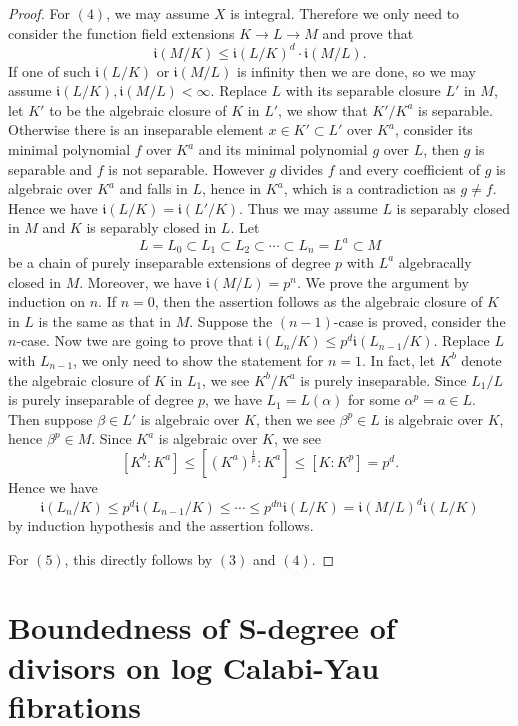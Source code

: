 \documentclass[letterpaper,reqno,12pt]{amsart}
\numberwithin{equation}{section}
\theoremstyle{plain}
\begin{document}
\begin{proof}
    For $(4)$, we may assume $X$ is integral. Therefore we only need to consider the function field extensions $K\to L\to M$ and prove that \[\mathfrak i(M/K)\leq \mathfrak i(L/K)^d\cdot\mathfrak i(M/L).\] If one of such $\mathfrak i(L/K)$ or $\mathfrak i(M/L)$ is infinity then we are done, so we may assume $\mathfrak i(L/K),\mathfrak i(M/L)<\infty$. Replace $L$ with its separable closure $L'$ in $M$, let $K'$ to be the algebraic closure of $K$ in $L'$, we show that $K'/K^a$ is separable. Otherwise there is an inseparable element $x\in K'\subset L'$ over $K^a$, consider its minimal polynomial $f$ over $K^a$ and its minimal polynomial $g$ over $L$, then $g$ is separable and $f$ is not separable. However $g$ divides $f$ and every coefficient of $g$ is algebraic over $K^a$ and falls in $L$, hence in $K^a$, which is a contradiction as $g\neq f$. Hence we have $\mathfrak i(L/K)=\mathfrak i(L'/K)$. Thus we may assume $L$ is separably closed in $M$ and $K$ is separably closed in $L$. Let \[L=L_0\subset L_1\subset L_2\subset\cdots\subset L_n=L^a\subset M\] be a chain of purely inseparable extensions of degree $p$ with $L^a$ algebracally closed in $M$. Moreover, we have $\mathfrak i(M/L)=p^n$. We prove the argument by induction on $n$. If $n=0$, then the assertion follows as the algebraic closure of $K$ in $L$ is the same as that in $M$. Suppose the $(n-1)$-case is proved, consider the $n$-case. Now twe are going to prove that $\mathfrak i(L_n/K)\leq p^d\mathfrak i(L_{n-1}/K)$. Replace $L$ with $L_{n-1}$, we only need to show the statement for $n=1$. In fact, let $K^b$ denote the algebraic closure of $K$ in $L_1$, we see $K^b/K^a$ is purely inseparable. Since $L_1/L$ is purely inseparable of degree $p$, we have $L_1=L(\alpha)$ for some $\alpha^p=a\in L$. Then suppose $\beta\in L'$ is algebraic over $K$, then we see $\beta^p\in L$ is algebraic over $K$, hence $\beta^p\in M$. Since $K^a$ is algebraic over $K$, we see \[[K^b:K^a]\leq [(K^a)^\frac{1}{p}:K^a]\leq [K:K^p]=p^d.\] Hence we have\[\mathfrak i(L_n/K)\leq p^d\mathfrak i(L_{n-1}/K)\leq\cdots\leq p^{dn}\mathfrak i(L/K)=\mathfrak i(M/L)^d\mathfrak i(L/K)\] by induction hypothesis and the assertion follows.

    For $(5)$, this directly follows by $(3)$ and $(4)$.
\end{proof}



\section{Boundedness of S-degree of divisors on log Calabi-Yau fibrations}
\end{document}
